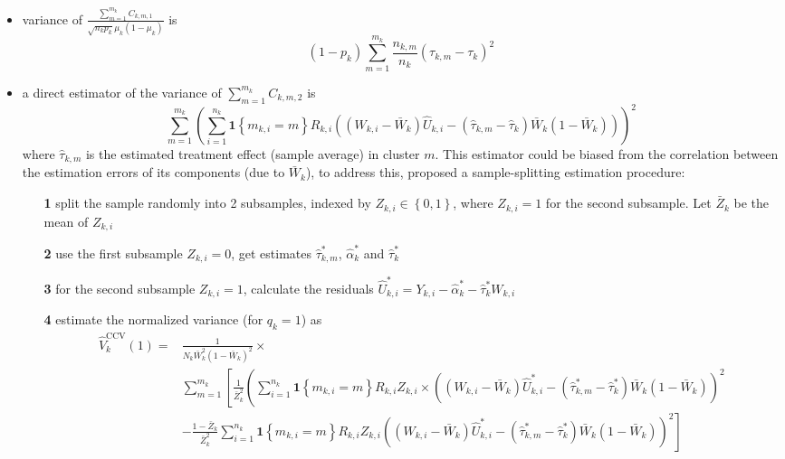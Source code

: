 \documentclass[twoside]{article}
\begin{document}
\begin{itemize}
    \item variance of $\frac{\sum^{m_k}_{m=1}C_{k,m,1}}{\sqrt{n_kp_k}\mu_k \left(1-\mu_k\right)}$ is $$ \left(1-p_k\right) \sum^{m_k}_{m=1}\frac{n_{k,m}}{n_k}\left(\tau_{k,m}-\tau_k\right)^2 $$
    \item a direct estimator of the variance of $\sum^{m_k}_{m=1} C_{k,m,2}$ is $$ \sum^{m_k}_{m=1}\left( \sum^{n_k}_{i=1}\mathbf{1}\left\{m_{k,i}=m\right\} R_{k,i}\left(\left(W_{k,i}-\bar{W}_k\right)\hat{U}_{k,i} -\left(\hat{\tau}_{k,m}-\hat{\tau}_k\right)\bar{W}_k\left(1-\bar{W}_k\right) \right) \right)^2 $$
    where $\hat{\tau}_{k,m}$ is the estimated treatment effect (sample average) in cluster $m$. This estimator could be biased from the correlation between the estimation errors of its components (due to $\bar{W}_k$), to address this, \citet{abadie2023should} proposed a sample-splitting estimation procedure:
    \begin{itemize}
        \item[\textbf{1}] split the sample randomly into 2 subsamples, indexed by $Z_{k,i}\in \left\{0,1\right\}$, where $Z_{k,i}=1$ for the second subsample. Let $\bar{Z}_k$ be the mean of $Z_{k,i}$
        \item[\textbf{2}] use the first subsample $Z_{k,i}=0$, get estimates $\hat{\tau}^*_{k,m}$, $\hat{\alpha}^*_k$ and $\hat{\tau}^*_k$ 
        \item[\textbf{3}] for the second subsample $Z_{k,i}=1$, calculate the residuals $\hat{U}^*_{k,i} = Y_{k,i} - \hat{\alpha}^*_k -\hat{\tau}^*_k W_{k,i}$
        \item[\textbf{4}] estimate the normalized variance (for $q_k=1$) as 
        \begin{align*}
            \hat{V}^{\text{CCV}}_k(1) =& \frac{1}{N_k \bar{W}^2_k \left(1-\bar{W}_k\right)^2} \times \\
            & \sum^{m_k}_{m=1} \left[ \frac{1}{\bar{Z}^2_k} \left( \sum^{n_k}_{i=1} \mathbf{1}\left\{m_{k,i}=m\right\}R_{k,i}Z_{k,i}\times \left(\left(W_{k,i}-\bar{W}_k\right)\hat{U}^*_{k,i} - \left(\hat{\tau}^*_{k,m}-\hat{\tau}^*_k\right) \bar{W}_k\left(1-\bar{W}_k\right) \right)^2 \right. \right. \\
            & \left. - \frac{1-\bar{Z}_k}{\bar{Z}^2_k} \sum^{n_k}_{i=1} \mathbf{1}\left\{m_{k,i}=m\right\} R_{k,i}Z_{k,i}\left( \left(W_{k,i}-\bar{W}_k\right)\hat{U}^*_{k,i} - \left(\hat{\tau}^*_{k,m}-\hat{\tau}^*_k\right)\bar{W}_k \left(1-\bar{W}_k\right) \right)^2 \right] \\

\end{align*}
\end{itemize}
\end{itemize}
\end{document}
